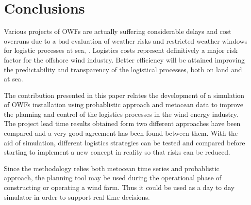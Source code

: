 \section{Conclusions}
\label{conclusions}
Various projects of OWFs are actually suffering considerable delays and cost overruns due to a bad evaluation of weather risks and restricted weather windows for logistic processes at sea, \cite{TCE12, ISOPE2013}. Logistics costs represent definitively a major risk factor for the offshore wind industry. Better efficiency will be attained improving the predictability and transparency of the logistical processes, both on land and at sea.

The contribution presented in this paper relates the development of a simulation of OWFs installation using probablistic approach and metocean data to improve the planning and control of the logistics processes in the wind energy industry. The project lead time results obtained form two different approaches have been compared and a very good agreement has been found between them. With the aid of simulation, different logistics strategies can be tested and compared before starting to implement a new concept in reality so that risks can be reduced.

Since the methodology relies both metocean time series and probablistic approach, the planning tool may be used during the operational phase of constructing or operating a wind farm. Thus it could be used as a day to day simulator in order to support real-time decisions.
